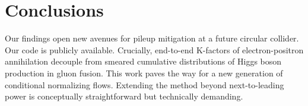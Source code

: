 \section{Conclusions}\label{sec:conclusions}

Our findings open new avenues for pileup mitigation at a future circular
collider. Our code is publicly available. Crucially, end-to-end
K-factors of electron-positron annihilation decouple from smeared
cumulative distributions of Higgs boson production in gluon fusion. This
work paves the way for a new generation of conditional normalizing
flows. Extending the method beyond next-to-leading power is conceptually
straightforward but technically demanding.

